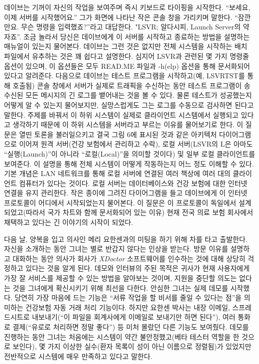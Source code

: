 \documentclass[a4paper,10pt,twoside]{book}
\begin{document}
데이브는 기꺼이 자신의 작업을 보여주며 즉시 키보드로 타이핑을 시작한다. ``보세요, 이제 서버를 시작했어요.'' 그가 화면에 나타난 작은 콘솔 창을 가리키며 말한다. ``잠깐만요. 무슨 명령을 입력했죠?''라고 대답한다. "LSVR; 알다시피, Launch Server의 약자죠''. 조금 놀라서 당신은 데이브에게 이 서버를 시작하고 종료하는 방법을 설명하는 매뉴얼이 있는지 물어본다. 데이브는 그런 것은 없지만 전체 시스템을 시작하는 배치 파일에서 유추하는 것은 꽤 쉽다고 설명한다. 심지어 LSVR과 관련된 몇 가지 명령줄 옵션이 있으며, 이 옵션들은 모두 READ.ME 파일과 -h(elp) 옵션을 통해 문서화되어 있다고 알려준다. 다음으로 데이브는 테스트 프로그램을 시작하고(예, LSVRTST를 통해 호출됨) 콘솔 창에서 서버가 실제로 트래픽을 수신하는 동안 테스트 프로그램이 송수신된 모든 메시지의 긴 로그를 뱉어내는 것을 볼 수 있다. 물론 테스트가 성공했는지 어떻게 알 수 있는지 물어보지만, 실망스럽게도 그는 로그를 수동으로 검사하면 된다고 말한다. 주제를 바꿔서 이 하위 시스템이 실제로 클라이언트 시스템에서 실행되고 있다고 생각하기 때문에 이 하위 시스템을 서버라고 부르는 이유를 물어보기로 한다. 이 질문은 열띤 토론을 불러일으키고 결국 그림 6에 표시된 것과 같은 아키텍처 다이어그램으로 이어져 원격 서버(건강 보험에서 관리하고 수락), 로컬 서버(LSVR의 L은 아마도 ``실행(Launch)''이 아니라 ``로컬(Local)''을 의미할 것이다) 및 일부 로컬 클라이언트를 보여준다. 이 설명을 통해 전체 시스템이 어떻게 작동하는지 어느 정도 이해할 수 있다. 기본 개념은 LAN 네트워크를 통해 로컬 서버에 연결된 여러 책상에 여러 대의 클라이언트 컴퓨터가 있다는 것이다. 로컬 서버는 데이터베이스와 건강 보험에 대한 인터넷 연결을 유지 관리한다. 작은 종이에 그려진 다이어그램을 들고 데이브에게 이 인터넷 프로토콜이 어디에서 시작되었는지 물어본다. 이 질문은 이 프로토콜이 독일에서 설계되었고(따라서 국가 차트와 함께 문서화되어 있는 이유) 현재 전국 의료 보험 회사에서 채택하고 있다는 긴 이야기의 시작이 되었다.

다음 날, 양복을 입고 의사인 메리 요한센과의 미팅을 하기 위해 차를 타고 출발한다. 자신을 소개하는 동안 그녀는 별로 반갑지 않다는 인상을 받는다. 방문 이유를 설명하고 대화하는 동안 의사가 회사가 \emph{XDoctor} 소프트웨어를 인수하는 것에 대해 상당히 걱정하고 있다는 것을 알게 된다. 데모와 인터뷰의 주된 목적은 귀사가 현재 사용자에게 가장 잘 서비스를 제공할 수 있는 방법을 알아보는 것이며, 지원을 중단할 의도는 없다는 것을 그녀에게 확신시키기 위해 최선을 다한다. 안심한 그녀는 실제 데모를 시작했다. 당연히 가장 마음에 드는 기능은 ``서류 작업을 할 비서를 줄일 수 있다는 점''을 의미하는 건강보험 자동 거래 처리 기능이다. 하지만 요한센 박사는 내장 이메일, 스프레드시트로 내보내기(``이 파일을 회계사에게 이메일로 보내기만 하면 된다''), 여러 통화로 결제(``유로로 처리하면 정말 좋다'') 등 미처 몰랐던 다른 기능도 보여줬다. 데모를 진행하는 동안 그녀는 처음에는 시스템이 약간 불안정했고(베타 테스터 역할을 한 것으로 보인다), 몇 가지 이상한 실수(환자 목록이 성이 아닌 이름으로 정렬됨)가 있었지만 전반적으로 시스템에 매우 만족하고 있다고 말한다.
\end{document}

